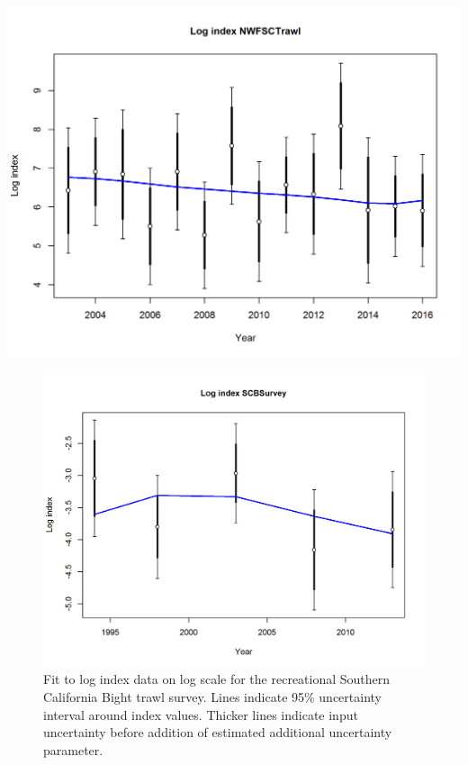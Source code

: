\documentclass[12pt,]{article}
\begin{document}
\includegraphics{r4ss/plots_mod1/index5_logcpuefit_NWFSCtrawl.png}

\begin{figure}[htbp]
\centering
\includegraphics{r4ss/plots_mod1/index5_logcpuefit_SCBSurvey.png}
\caption{Fit to log index data on log scale for the recreational
Southern California Bight trawl survey. Lines indicate 95\% uncertainty
interval around index values. Thicker lines indicate input uncertainty
before addition of estimated additional uncertainty parameter.
\label{fig:index5_logcpuefit_SCBSurvey}}
\end{figure}
\end{document}
